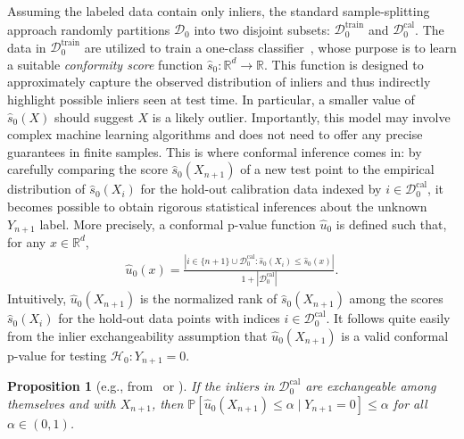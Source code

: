 \documentclass[11pt]{article}
\newtheorem{proposition}{Proposition}
\renewcommand{\P}[1]{\mathbb{P}\left[#1\right]}
\begin{document}
Assuming the labeled data contain only inliers, the standard sample-splitting approach randomly partitions $\mathcal{D}_0$ into two disjoint subsets: $\mathcal{D}_0^{\mathrm{train}}$ and $\mathcal{D}_0^{\mathrm{cal}}$.
The data in $\mathcal{D}_0^{\mathrm{train}}$ are utilized to train a one-class classifier~\cite{moya1993one,pimentel2014review}, whose purpose is to learn a suitable {\em conformity score} function $\hat{s}_0 : \mathbb{R}^d \to \mathbb{R}$. This function is designed to approximately capture the observed distribution of inliers and thus indirectly highlight possible inliers seen at test time. In particular, a smaller value of $\hat{s}_0(X)$ should suggest $X$ is a likely outlier.
Importantly, this model may involve complex machine learning algorithms and does not need to offer any precise guarantees in finite samples.
This is where conformal inference comes in: by carefully comparing the score $\hat{s}_0(X_{n+1})$ of a new test point to the empirical distribution of $\hat{s}_0(X_i)$ for the hold-out calibration data indexed by $i \in \mathcal{D}_0^{\mathrm{cal}}$, it becomes possible to obtain rigorous statistical inferences about the unknown $Y_{n+1}$ label.
More precisely, a conformal p-value function $\hat{u}_0$ is defined such that, for any $x \in \mathbb{R}^d$,
\begin{align} \label{eq:p-value-0}
  \hat{u}_0(x) = \frac{|i\in \{n+1\} \cup \mathcal{D}_{0}^{\mathrm{cal}} : \hat{s}_0(X_i) \leq  \hat{s}_0(x)|}{1+|\mathcal{D}_{0}^{\mathrm{cal}}|}.
\end{align}
Intuitively, $\hat{u}_0(X_{n+1})$ is the normalized rank of $\hat{s}_0(X_{n+1})$ among the scores $\hat{s}_0(X_i)$ for the hold-out data points with indices $i \in \mathcal{D}_0^{\mathrm{cal}}$.
It follows quite easily from the inlier exchangeability assumption that $\hat{u}_0(X_{n+1})$ is a valid conformal p-value for testing $\mathcal{H}_0: Y_{n+1}=0$.
\begin{proposition}[e.g., from~\cite{vovk2003mondrian} or \cite{bates2021testing}] \label{prop:standard-p-values}
  If the inliers in $\mathcal{D}_0^{\mathrm{cal}}$ are exchangeable among themselves and with $X_{n+1}$, then $\P{\hat{u}_0(X_{n+1}) \leq \alpha \mid Y_{n+1} = 0} \leq \alpha$ for all $\alpha \in (0,1)$.
\end{proposition}
\end{document}
